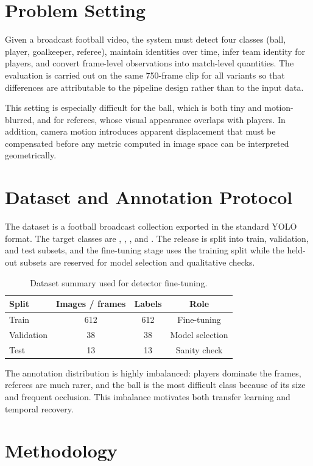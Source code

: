 \documentclass[11pt,a4paper]{article}
\newcommand{\metric}[1]{\texttt{\detokenize{#1}}}
\begin{document}
\section{Problem Setting}
Given a broadcast football video, the system must detect four classes (ball, player, goalkeeper, referee), maintain identities over time, infer team identity for players, and convert frame-level observations into match-level quantities. The evaluation is carried out on the same 750-frame clip for all variants so that differences are attributable to the pipeline design rather than to the input data.

This setting is especially difficult for the ball, which is both tiny and motion-blurred, and for referees, whose visual appearance overlaps with players. In addition, camera motion introduces apparent displacement that must be compensated before any metric computed in image space can be interpreted geometrically.

\section{Dataset and Annotation Protocol}
The dataset is a football broadcast collection exported in the standard YOLO format. The target classes are \metric{ball}, \metric{player}, \metric{goalkeeper}, and \metric{referee}. The release is split into train, validation, and test subsets, and the fine-tuning stage uses the training split while the held-out subsets are reserved for model selection and qualitative checks.

\begin{table}[H]
\centering
\caption{Dataset summary used for detector fine-tuning.}
\begin{tabular}{lccc}
\toprule
Split & Images / frames & Labels & Role \\
\midrule
Train & 612 & 612 & Fine-tuning \\
Validation & 38 & 38 & Model selection \\
Test & 13 & 13 & Sanity check \\
\bottomrule
\end{tabular}
\end{table}

The annotation distribution is highly imbalanced: players dominate the frames, referees are much rarer, and the ball is the most difficult class because of its size and frequent occlusion. This imbalance motivates both transfer learning and temporal recovery.

\section{Methodology}
\end{document}
